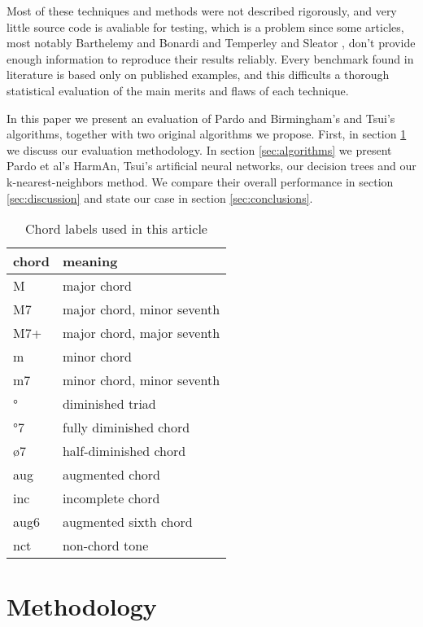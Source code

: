 \documentclass{article}
\begin{document}
Most of these techniques and methods were not described rigorously,
and very little source code is avaliable for testing, which is a
problem since some articles, most notably Barthelemy and Bonardi
\cite{barthelemy.ea:figured} and Temperley and Sleator
\cite{temperley.ea:modeling}, don't provide enough information to
reproduce their results reliably. Every benchmark found in literature
\cite{pardo.ea:automated, barthelemy.ea:figured, tsui:harmonic,
  taube:automatic, illescas.ea:harmonic} is based only on published
examples, and this difficults a thorough statistical evaluation of the
main merits and flaws of each technique.

In this paper we present an evaluation of Pardo and Birmingham's and
Tsui's algorithms, together with two original algorithms we propose.
First, in section \ref{sec:methodology} we discuss our evaluation
methodology. In section \ref{sec:algorithms} we present Pardo et al's
HarmAn, Tsui's artificial neural networks, our decision trees and our
k-nearest-neighbors method. We compare their overall performance in
section \ref{sec:discussion} and state our case in section
\ref{sec:conclusions}.

\begin{table}
\centering
\begin{tabular}{l|l}
chord & meaning \\ \hline
    M & major chord \\
   M7 & major chord, minor seventh \\
  M7+ & major chord, major seventh \\
    m & minor chord \\
   m7 & minor chord, minor seventh \\
    ° & diminished triad \\
   °7 & fully diminished chord \\
   ø7 & half-diminished chord \\
  aug & augmented chord \\
  inc & incomplete chord \\
 aug6 & augmented sixth chord \\
  nct & non-chord tone \\
\end{tabular}
\caption{Chord labels used in this article}
\label{tab:legenda}
\end{table}

\section{Methodology}
\label{sec:methodology}
\end{document}
